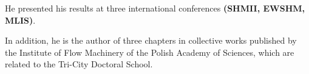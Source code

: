 \documentclass[12pt,a4paper]{article}
\begin{document}
	\noindent	
	He presented his results at three international conferences \textbf{(SHMII, EWSHM, MLIS)}.
	
	
	\noindent
	In addition, he is the author of three chapters in collective works published by the Institute of Flow Machinery of the Polish Academy of Sciences, which are related to the Tri-City Doctoral School.
	
	\noindent
\end{document}
